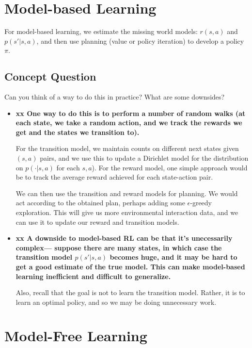 \documentclass[12pt]{article}
\begin{document}
\section{Model-based Learning}

For model-based learning, we estimate the missing world models: $r(s, a)$ and $p(s'|s, a)$, and then use planning (value or policy iteration) to develop a policy $\pi$. 

\subsection{Concept Question}

Can you think of a way to do this in practice? What are some
downsides?

%
\begin{itemize}
\item {\bf xx One way to do this is to perform a number of random walks (at
  each state, we take a random action, and we track the rewards we get
  and the states we transition to). 
  
  For the transition model, we maintain counts on different next states
  given $(s,a)$ pairs, and we use this to update a Dirichlet model for
  the distribution on $p(\cdot|s,a)$ for each $s,a$). For the reward model,
  one simple approach would be to track the average reward achieved
  for each state-action pair.

  We can then use the transition and reward models for planning. We would act according to the obtained plan, perhaps adding some $\epsilon$-greedy exploration. This will give us more environmental interaction data, and we can use it to update our reward and transition models.}
\item {\bf xx A downside to model-based RL can be that
  it's unecessarily complex--- suppose there are many states, in
  which case the transition model $p(s'|s,a)$ becomes huge, and it may
  be hard to get a good estimate of the true model.
This can make model-based learning inefficient and 
difficult to generalize.

Also, recall that  the goal is not to learn the
  transition model. Rather,  it is to learn an optimal policy, and so we may be
  doing unnecessary work. }
\end{itemize} 

\vspace{.5pc}

\section{Model-Free Learning}
\end{document}
